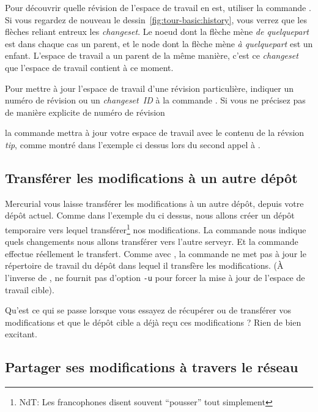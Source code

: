 Pour découvrir quelle révision de l'espace de travail en est, utiliser
la commande . 
Si vous regardez de nouveau le dessin~\ref{fig:tour-basic:history}, vous
verrez que les flèches reliant entreux les \textit{changeset}. Le noeud 
dont la flèche mène \emph{de quelquepart} est dans chaque cas un parent, 
et le node dont la flèche mène \emph{à quelquepart} est un enfant. 
L'espace de travail a un parent de la même manière, c'est ce \textit{changeset} 
que l'espace de travail contient à ce moment.

Pour mettre à jour l'espace de travail d'une révision particulière, 
indiquer un numéro de révision ou un \textit{changeset~ID} à la commande 
.
Si vous ne précisez pas de manière explicite de numéro de révision

la commande  mettra à jour votre espace de travail avec
le contenu de la révsion \textit{tip}, comme montré dans l'exemple 
ci dessus lors du second appel à .

\subsection{Transférer les modifications à un autre dépôt}

Mercurial vous laisse transférer les modifications à un autre
dépôt, depuis votre dépôt actuel. Comme dans l'exemple du 
 ci dessus, nous allons créer un dépôt temporaire
vers lequel transférer\footnote{NdT: Les francophones disent souvent 
``pousser'' tout simplement} nos modifications.
La commande  nous indique quels changements nous
allons transférer vers l'autre serveyr.
Et la commande  effectue réellement le transfert.
Comme avec , la commande  ne met pas à jour
le répertoire de travail du dépôt dans lequel il transfère les 
modifications. (À l'inverse de ,  ne fournit
pas d'option \texttt{-u} pour forcer la mise à jour de l'espace
de travail cible).

Qu'est ce qui se passe lorsque vous essayez de récupérer ou de transférer
vos modifications et que le dépôt cible a déjà reçu ces modifications ? 
Rien de bien excitant.

\subsection{Partager ses modifications à travers le réseau}

